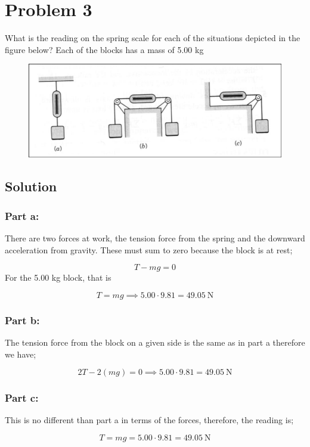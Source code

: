 \documentclass{article}
\begin{document}
\section*{Problem 3}
What is the reading on the spring scale for each of the situations depicted in the figure below? Each of the
blocks has a mass of 5.00 kg
\begin{figure}[ht]
    \centering
    \includegraphics[scale=.3]{drawing-1.png}
\end{figure}

\subsection*{Solution}
\subsubsection*{Part a:}
There are two forces at work, the tension force from the spring and the downward acceleration from gravity. These must sum to zero because the block is at rest;

\[
	T-mg = 0
\]
For the 5.00 kg block, that is

\[
	T = mg \implies 5.00 \cdot 9.81 = 49.05\ \text{N}
\]

\subsubsection*{Part b:}
The tension force from the block on a given side is the same as in part a therefore we have;

\[
	2T - 2(mg) = 0 \implies 5.00 \cdot 9.81 = 49.05\ \text{N}
\]

\subsubsection*{Part c:}
This is no different than part a in terms of the forces, therefore, the reading is;

\[
	T = mg = 5.00 \cdot 9.81 = 49.05\ \text{N}
\]
\end{document}
